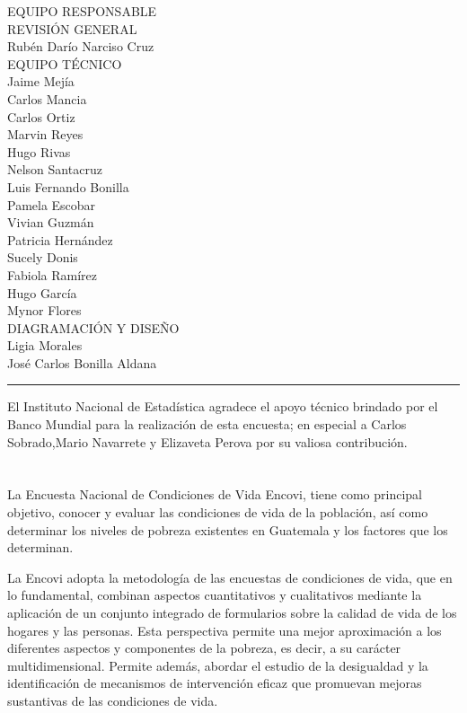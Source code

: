 $\ $
\vspace{1cm}

\begin{center}
	{\Bold \LARGE EQUIPO RESPONSABLE}\\[2cm]
	
	{\Bold \large \color{color1!89!black} REVISIÓN GENERAL}\\[0.2cm]
	Rubén Darío Narciso Cruz\\[0.8cm]
	
	
	{\Bold \large \color{color1!89!black} EQUIPO TÉCNICO}\\[0.2cm]
	Jaime Mejía\\
	Carlos Mancia\\
	Carlos Ortiz\\
	Marvin Reyes\\
	Hugo Rivas\\
	Nelson Santacruz \\
	Luis Fernando Bonilla\\
	Pamela Escobar\\
	Vivian Guzmán\\
	Patricia Hernández\\
	Sucely Donis \\
	Fabiola Ramírez \\
	Hugo García \\
	Mynor Flores \\[0.8cm]
	
{\Bold \large \color{color1!89!black} DIAGRAMACIÓN Y DISEÑO}\\[0.2cm]
Ligia Morales\\
José Carlos Bonilla Aldana
\end{center}
\vfill
\hrule 
El Instituto Nacional de Estadística agradece el apoyo técnico brindado por el Banco Mundial para la realización de esta encuesta; en especial a Carlos Sobrado,Mario Navarrete y  Elizaveta Perova por su valiosa contribución. 
\cleardoublepage
$\ $\\[2cm]
\\\\
 
 La Encuesta Nacional de Condiciones de Vida \textemdash Encovi\textemdash, tiene como principal objetivo, conocer y evaluar las condiciones de vida de la población, así como determinar los niveles de pobreza existentes en Guatemala y los factores que los determinan.
 
 La Encovi adopta la metodología de las encuestas de condiciones de vida, que en lo fundamental, combinan aspectos cuantitativos y cualitativos mediante la aplicación de un conjunto integrado de formularios sobre la calidad de vida de los hogares y las personas. Esta perspectiva permite una mejor aproximación a los diferentes aspectos y componentes de la pobreza, es decir, a su carácter multidimensional. Permite además, abordar el estudio de la desigualdad y la identificación de mecanismos de intervención eficaz que promuevan mejoras sustantivas de las condiciones de vida.

